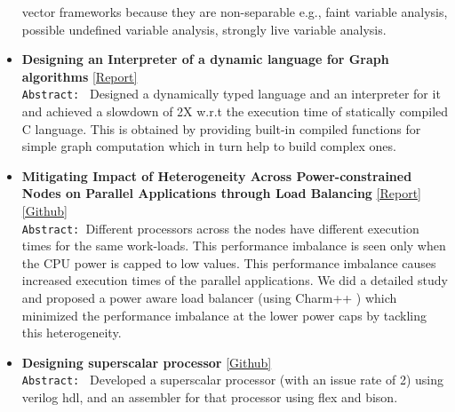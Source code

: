 \documentclass[9pt]{article}
\newenvironment{changemargin}[2]{%
  \begin{list}{}{%
    \setlength{\topsep}{0pt}%
    \setlength{\leftmargin}{#1}%
    \setlength{\rightmargin}{#2}%
    \setlength{\listparindent}{\parindent}%
    \setlength{\itemindent}{\parindent}%
    \setlength{\parsep}{\parskip}%
  }%
  \item[]}{\end{list}
}
\newenvironment{body} {
	\vspace*{-16pt}
	\begin{changemargin}{-0.25in}{-0.5in}
  }	
	{\end{changemargin}
}
\begin{document}
\begin{body}
\begin{itemize}
                                vector frameworks because they are
                                non-separable e.g., faint variable analysis,
                                possible undefined variable analysis, strongly
                                live variable analysis.	
 \item \textbf{Designing an Interpreter of a dynamic language for Graph
algorithms}
           \href{http://web.engr.illinois.edu/~sdasgup3/Document/report_cs598dhp.pdf}{[Report]} \\
                                  \texttt{Abstract: } 
                                  Designed a dynamically typed language and an interpreter for it and 
                                  achieved a slowdown of 2X w.r.t the execution time of statically compiled C
                                  language. This is obtained by providing built-in compiled functions 
                                  for simple graph computation which in turn help to build complex
                                  ones.

          \item \textbf{Mitigating Impact of Heterogeneity Across Power-constrained Nodes on Parallel Applications through Load Balancing}     
                                \href{http://web.engr.illinois.edu/~sdasgup3/Document/report_cs533.pdf}{[Report]}
                                \href{https://github.com/sdasgup3/heterogeneity-aware-load-balancing}{[Github]} \\
                                  \texttt{Abstract: }Different processors across the nodes
                                  have different execution times for the same
                                  work-loads. This performance imbalance is seen
                                  only when the CPU power is capped to low
                                  values. This performance imbalance causes
                                  increased execution times of the parallel
                                  applications. We did a detailed study and
                                  proposed a power aware load balancer (using
                                      Charm++ ) which minimized the performance
                                  imbalance at the lower power caps by tackling
                                  this heterogeneity.  
           \item \textbf{Designing superscalar processor} \href{https://github.com/sdasgup3/parallel-processor-design}{[Github]} \\
                                \texttt{Abstract: } Developed a superscalar processor (with  an
                                    issue rate of 2) using verilog hdl, and an
                                assembler for that processor using flex and
                                bison.  


\end{itemize}
\end{body}
\end{document}

